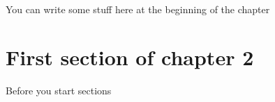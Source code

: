 You can write some stuff here at the beginning of the chapter


\section{First section of chapter 2}

Before you start sections